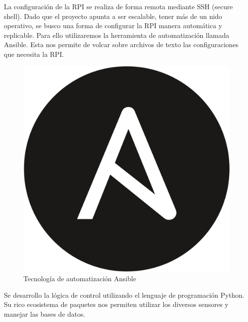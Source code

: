 La configuración de la RPI se realiza de forma remota mediante SSH (secure shell).
Dado que el proyecto apunta a ser escalable, tener más de un nido operativo, se busco una forma de configurar la RPI manera automática y replicable. Para ello utilizaremos la herramienta  de automatización llamada Ansible. Esta nos permite de volcar sobre archivos de texto las configuraciones que necesita la RPI.

\begin{figure}[H]
	\centering
	\includegraphics[width=0.2\linewidth]{"../Ingenieria de Detalle/ImagenesIngenieria de Detalle/Ansible_logo"}
	\caption{Tecnología de automatización Ansible}
	\label{fig:ansiblelogo}
\end{figure}


Se desarrollo la lógica de control utilizando el lenguaje de programación Python. Su rico ecosistema de paquetes nos permiten utilizar los diversos sensores y manejar las bases de datos.













